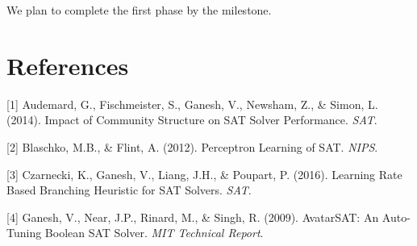 \documentclass{article}
\begin{document}
We plan to complete the first phase by the milestone. %

\section*{References}
\label{references}

\small

[1] Audemard, G., Fischmeister, S., Ganesh, V., Newsham, Z., \& Simon, L. (2014).
Impact of Community Structure on SAT Solver Performance. \textit{SAT}.

[2] Blaschko, M.B., \& Flint, A. (2012).
Perceptron Learning of SAT. \textit{NIPS}.

[3] Czarnecki, K., Ganesh, V., Liang, J.H., \& Poupart, P. (2016).
Learning Rate Based Branching Heuristic for SAT Solvers. \textit{SAT}.

[4] Ganesh, V., Near, J.P., Rinard, M., \& Singh, R. (2009).
AvatarSAT: An Auto-Tuning Boolean SAT Solver. \textit{MIT Technical Report}.
\end{document}
